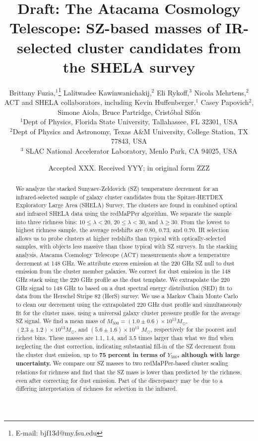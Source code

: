 \documentclass[a4paper,fleqn,usenatbib]{mnras}
\title[SZ effect in SHELA cluster candidates]{Draft: The Atacama Cosmology Telescope: SZ-based masses of IR-selected cluster candidates from the SHELA survey}
\author[B. Fuzia et al.]{
Brittany Fuzia,$^{1}$\thanks{E-mail: bjf13d@my.fsu.edu}
Lalitwadee Kawinwanichakij,$^{2}$
Eli Rykoff,$^{3}$
Nicola Mehrtens,$^{2}$
\newauthor ACT and SHELA collaborators, 
including
Kevin Huffenberger,$^1$ 
Casey Papovich$^{2}$, 
\newauthor Simone Aiola, Bruce Partridge, Crist\'obal Sif\'on
\\
$^{1}$Dept of Physics, Florida State University, Tallahassee, FL 32301, USA\\
$^{2}$Dept of Physics and Astronomy, Texas A\&M University, College Station, TX 77843, USA\\
$^{3}$ SLAC National Accelerator Laboratory, Menlo Park, CA 94025, USA\\
}
\date{Accepted XXX. Received YYY; in original form ZZZ}
\begin{document}
\label{firstpage}
\pagerange{\pageref{firstpage}--\pageref{lastpage}}
\maketitle

\begin{abstract}
We analyze the stacked Sunyaev-Zeldovich (SZ) temperature decrement for an infrared-selected sample of galaxy cluster candidates from the Spitzer-HETDEX Exploratory Large Area (SHELA) Survey. The clusters are found in combined optical and infrared SHELA data using the redMaPPer algorithm. We separate the sample into three richness bins: $10 \leq \lambda < 20$, $20 \leq \lambda < 30$, and $\lambda \geq 30$. From the lowest to highest richness sample, the average redshifts are 0.80, 0.73, and 0.70. IR selection allows us to probe clusters at higher redshifts than typical with optically-selected samples, with objects less massive than those typical with SZ surveys. In the stacking analysis, Atacama Cosmology Telescope (ACT) measurements show a temperature decrement at 148 GHz. We attribute excess emission at the 220 GHz SZ null to dust emission from the cluster member galaxies. We correct for dust emission in the 148 GHz stack using the 220 GHz profile as the dust template. We extrapolate the 220 GHz signal to 148 GHz to based on a dust spectral energy distribution (SED) fit to data from the Herschel Stripe 82 (HerS) survey.  We use a Markov Chain Monte Carlo to clean our decrement using the extrapolated 220 GHz dust profile and simultaneously fit for the cluster mass, using a universal galaxy cluster pressure profile for the average SZ signal.  We find a mean mass of $M_{500} = (1.0 \pm 0.6)\times 10^{13} M_{\odot}$, $(2.3 \pm 1.2)\times 10^{13} M_{\odot}$, and $(5.6 \pm 1.6) \times 10^{13}$ $M_{\odot}$, respectively for the poorest and richest bins. These masses are 1.1, 1.4, and 3.5 times larger than what we find when neglecting the dust correction, indicating substantial fill-in of the SZ decrement from the cluster dust emission, up to \textbf{75 percent in terms of $Y_{500}$, although with large uncertainty.} We compare our SZ masses to two redMaPPer-based cluster scaling relations for richness and find that the SZ mass is lower than predicted by the richness, even after correcting for dust emission.  Part of the discrepancy may be due to a differing interpretation of richness for selection in the infrared.
\end{abstract}
\end{document}
